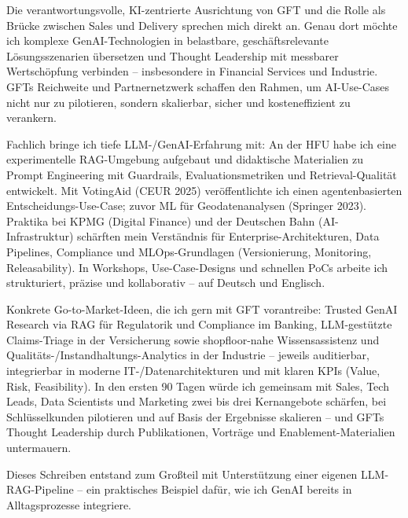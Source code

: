Die verantwortungsvolle, KI-zentrierte Ausrichtung von GFT und die Rolle als Brücke zwischen Sales und Delivery sprechen mich direkt an. Genau dort möchte ich komplexe GenAI-Technologien in belastbare, geschäftsrelevante Lösungsszenarien übersetzen und Thought Leadership mit messbarer Wertschöpfung verbinden – insbesondere in Financial Services und Industrie. GFTs Reichweite und Partnernetzwerk schaffen den Rahmen, um AI-Use-Cases nicht nur zu pilotieren, sondern skalierbar, sicher und kosteneffizient zu verankern.

Fachlich bringe ich tiefe LLM-/GenAI-Erfahrung mit: An der HFU habe ich eine experimentelle RAG-Umgebung aufgebaut und didaktische Materialien zu Prompt Engineering mit Guardrails, Evaluationsmetriken und Retrieval-Qualität entwickelt. Mit VotingAid (CEUR 2025) veröffentlichte ich einen agentenbasierten Entscheidungs-Use-Case; zuvor ML für Geodatenanalysen (Springer 2023). Praktika bei KPMG (Digital Finance) und der Deutschen Bahn (AI-Infrastruktur) schärften mein Verständnis für Enterprise-Architekturen, Data Pipelines, Compliance und MLOps-Grundlagen (Versionierung, Monitoring, Releasability). In Workshops, Use-Case-Designs und schnellen PoCs arbeite ich strukturiert, präzise und kollaborativ – auf Deutsch und Englisch.

Konkrete Go-to-Market-Ideen, die ich gern mit GFT vorantreibe: Trusted GenAI Research via RAG für Regulatorik und Compliance im Banking, LLM-gestützte Claims-Triage in der Versicherung sowie shopfloor-nahe Wissensassistenz und Qualitäts-/Instandhaltungs-Analytics in der Industrie – jeweils auditierbar, integrierbar in moderne IT-/Datenarchitekturen und mit klaren KPIs (Value, Risk, Feasibility). In den ersten 90 Tagen würde ich gemeinsam mit Sales, Tech Leads, Data Scientists und Marketing zwei bis drei Kernangebote schärfen, bei Schlüsselkunden pilotieren und auf Basis der Ergebnisse skalieren – und GFTs Thought Leadership durch Publikationen, Vorträge und Enablement-Materialien untermauern.

Dieses Schreiben entstand zum Großteil mit Unterstützung einer eigenen LLM-RAG-Pipeline – ein praktisches Beispiel dafür, wie ich GenAI bereits in Alltagsprozesse integriere.